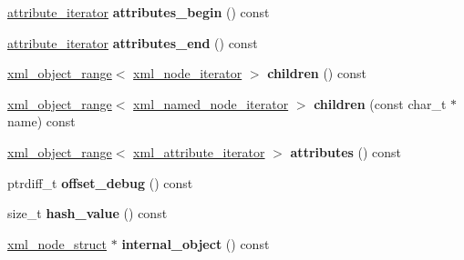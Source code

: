 \begin{DoxyCompactItemize}
\item 
\mbox{\label{classpugi_1_1xml__node_ac995c542187d0f076f4acc7d88709db2}} 
\hyperlink{classpugi_1_1xml__attribute__iterator}{attribute\+\_\+iterator} {\bfseries attributes\+\_\+begin} () const
\item 
\mbox{\label{classpugi_1_1xml__node_a5e20587b50f320bc89de71524341e88a}} 
\hyperlink{classpugi_1_1xml__attribute__iterator}{attribute\+\_\+iterator} {\bfseries attributes\+\_\+end} () const
\item 
\mbox{\label{classpugi_1_1xml__node_a3dd84eaeb958e8262f3edb7bda013101}} 
\hyperlink{classpugi_1_1xml__object__range}{xml\+\_\+object\+\_\+range}$<$ \hyperlink{classpugi_1_1xml__node__iterator}{xml\+\_\+node\+\_\+iterator} $>$ {\bfseries children} () const
\item 
\mbox{\label{classpugi_1_1xml__node_a412382032de565ac850078b0b3bd7a4f}} 
\hyperlink{classpugi_1_1xml__object__range}{xml\+\_\+object\+\_\+range}$<$ \hyperlink{classpugi_1_1xml__named__node__iterator}{xml\+\_\+named\+\_\+node\+\_\+iterator} $>$ {\bfseries children} (const char\+\_\+t $\ast$name) const
\item 
\mbox{\label{classpugi_1_1xml__node_a48d57ea59a862921b83bb48475976f77}} 
\hyperlink{classpugi_1_1xml__object__range}{xml\+\_\+object\+\_\+range}$<$ \hyperlink{classpugi_1_1xml__attribute__iterator}{xml\+\_\+attribute\+\_\+iterator} $>$ {\bfseries attributes} () const
\item 
\mbox{\label{classpugi_1_1xml__node_a66caab4dbec141d23467c453b81d10f6}} 
ptrdiff\+\_\+t {\bfseries offset\+\_\+debug} () const
\item 
\mbox{\label{classpugi_1_1xml__node_a1364756923465d561e53e9cc46436cac}} 
size\+\_\+t {\bfseries hash\+\_\+value} () const
\item 
\mbox{\label{classpugi_1_1xml__node_a43e02a850ab79bc392ad0987efabb8e8}} 
\hyperlink{structpugi_1_1xml__node__struct}{xml\+\_\+node\+\_\+struct} $\ast$ {\bfseries internal\+\_\+object} () const
\end{DoxyCompactItemize}
